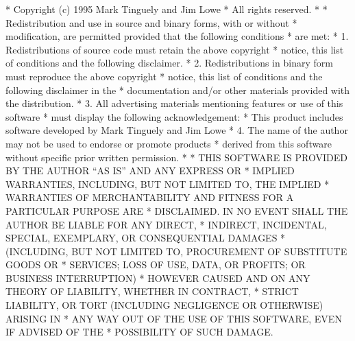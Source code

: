\begin{copyrightEnv}
 * Copyright (c) 1995 Mark Tinguely and Jim Lowe
 * All rights reserved.
 *
 * Redistribution and use in source and binary forms, with or without
 * modification, are permitted provided that the following conditions
 * are met:
 * 1. Redistributions of source code must retain the above copyright
 *    notice, this list of conditions and the following disclaimer.
 * 2. Redistributions in binary form must reproduce the above copyright
 *    notice, this list of conditions and the following disclaimer in the
 *    documentation and/or other materials provided with the distribution.
 * 3. All advertising materials mentioning features or use of this software
 *    must display the following acknowledgement:
 *      This product includes software developed by Mark Tinguely and Jim Lowe
 * 4. The name of the author may not be used to endorse or promote products
 *    derived from this software without specific prior written permission.
 *
 * THIS SOFTWARE IS PROVIDED BY THE AUTHOR ``AS IS'' AND ANY EXPRESS OR
 * IMPLIED WARRANTIES, INCLUDING, BUT NOT LIMITED TO, THE IMPLIED
 * WARRANTIES OF MERCHANTABILITY AND FITNESS FOR A PARTICULAR PURPOSE ARE
 * DISCLAIMED.  IN NO EVENT SHALL THE AUTHOR BE LIABLE FOR ANY DIRECT,
 * INDIRECT, INCIDENTAL, SPECIAL, EXEMPLARY, OR CONSEQUENTIAL DAMAGES
 * (INCLUDING, BUT NOT LIMITED TO, PROCUREMENT OF SUBSTITUTE GOODS OR
 * SERVICES; LOSS OF USE, DATA, OR PROFITS; OR BUSINESS INTERRUPTION)
 * HOWEVER CAUSED AND ON ANY THEORY OF LIABILITY, WHETHER IN CONTRACT,
 * STRICT LIABILITY, OR TORT (INCLUDING NEGLIGENCE OR OTHERWISE) ARISING IN
 * ANY WAY OUT OF THE USE OF THIS SOFTWARE, EVEN IF ADVISED OF THE
 * POSSIBILITY OF SUCH DAMAGE.
\end{copyrightEnv}

